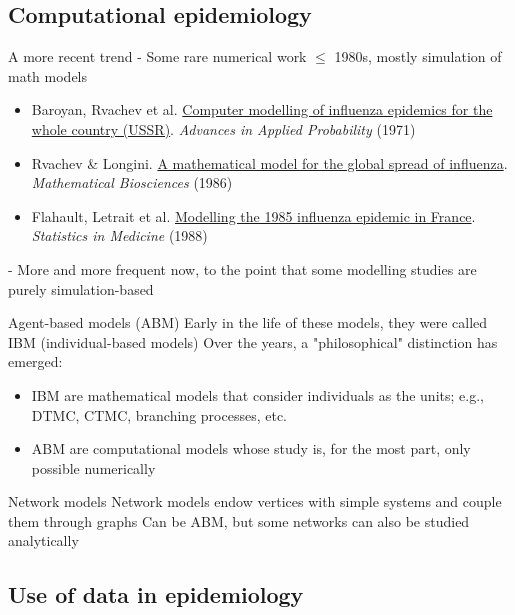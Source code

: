 \documentclass[aspectratio=169]{beamer}\usepackage[]{graphicx}\usepackage[]{xcolor}
\begin{document}
\subsection{Computational epidemiology}

\begin{frame}{A more recent trend}
- Some rare numerical work $\leq$ 1980s, mostly simulation of math models
\begin{itemize}
    \item Baroyan, Rvachev et al. \href{https://doi.org/10.2307/1426167}{Computer modelling of influenza epidemics for the whole country (USSR)}. \emph{Advances in Applied Probability} (1971) 
    \item Rvachev \& Longini. \href{https://doi.org/10.1016/0025-5564(85)90064-1}{A mathematical model for the global spread of influenza}. \emph{Mathematical Biosciences} (1986) 
    \item Flahault, Letrait et al. \href{https://doi.org/10.1002/sim.4780071107}{Modelling the 1985 influenza epidemic in France}. \emph{Statistics in Medicine} (1988)
\end{itemize}
\vfill
- More and more frequent now, to the point that some modelling studies are purely simulation-based
\end{frame}

\begin{frame}{Agent-based models (ABM)}
\bbullet Early in the life of these models, they were called IBM (individual-based models)
\vfill
\bbullet Over the years, a "philosophical" distinction has emerged:
\begin{itemize}
\item IBM are mathematical models that consider individuals as the units; e.g., DTMC, CTMC, branching processes, etc.
\item ABM are computational models whose study is, for the most part, only possible numerically 
\end{itemize}
\end{frame}

\begin{frame}{Network models}
\bbullet Network models endow vertices with simple systems and couple them through graphs
\vfill
\bbullet Can be ABM, but some networks can also be studied analytically

\end{frame}

\subsection{Use of data in epidemiology}
\end{document}
